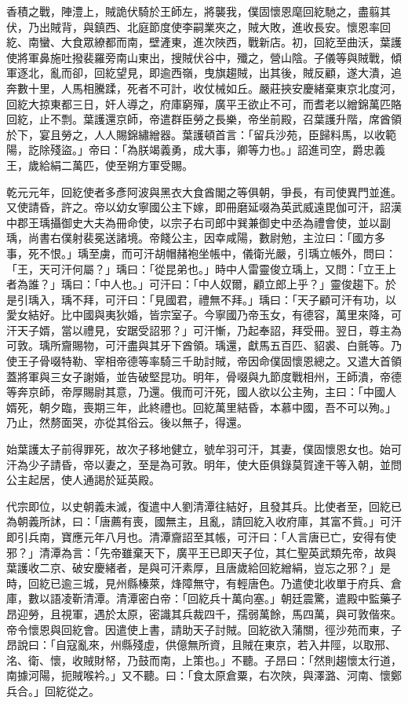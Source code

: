 \begin{pinyinscope}
 香積之戰，陣澧上，賊詭伏騎於王師左，將襲我，僕固懷恩麾回紇馳之，盡翦其伏，乃出賊背，與鎮西、北庭節度使李嗣業夾之，賊大敗，進收長安。懷恩率回紇、南蠻、大食眾繚都而南，壁滻東，進次陜西，戰新店。初，回紇至曲沃，葉護使將軍鼻施吐撥裴羅旁南山東出，搜賊伏谷中，殲之，營山陰。子儀等與賊戰，傾軍逐北，亂而卻，回紇望見，即逾西嶺，曳旗趨賊，出其後，賊反顧，遂大潰，追奔數十里，人馬相騰蹂，死者不可計，收仗械如丘。嚴莊挾安慶緒棄東京北度河，回紇大掠東都三日，奸人導之，府庫窮殫，廣平王欲止不可，而耆老以繒錦萬匹賂回紇，止不剽。葉護還京師，帝遣群臣勞之長樂，帝坐前殿，召葉護升階，席酋領於下，宴且勞之，人人賜錦繡繒器。葉護頓首言：「留兵沙苑，臣歸料馬，以收範陽，訖除殘盜。」帝曰：「為朕竭義勇，成大事，卿等力也。」詔進司空，爵忠義王，歲給絹二萬匹，使至朔方軍受賜。



 乾元元年，回紇使者多彥阿波與黑衣大食酋閣之等俱朝，爭長，有司使異門並進。又使請昏，許之。帝以幼女寧國公主下嫁，即冊磨延啜為英武威遠毘伽可汗，詔漢中郡王瑀攝御史大夫為冊命使，以宗子右司郎中巽兼御史中丞為禮會使，並以副瑀，尚書右僕射裴冕送諸境。帝餞公主，因幸咸陽，數尉勉，主泣曰：「國方多事，死不恨。」瑀至虜，而可汗胡帽赭袍坐帳中，儀衛光嚴，引瑀立帳外，問曰：「王，天可汗何屬？」瑀曰：「從昆弟也。」時中人雷靈俊立瑀上，又問：「立王上者為誰？」瑀曰：「中人也。」可汗曰：「中人奴爾，顧立郎上乎？」靈俊趨下。於是引瑀入，瑀不拜，可汗曰：「見國君，禮無不拜。」瑀曰：「天子顧可汗有功，以愛女結好。比中國與夷狄婚，皆宗室子。今寧國乃帝玉女，有德容，萬里來降，可汗天子婿，當以禮見，安踞受詔邪？」可汗慚，乃起奉詔，拜受冊。翌日，尊主為可敦。瑀所齎賜物，可汗盡與其牙下酋領。瑀還，獻馬五百匹、貂裘、白氈等。乃使王子骨啜特勒、宰相帝德等率騎三千助討賊，帝因命僕固懷恩總之。又遣大首領蓋將軍與三女子謝婚，並告破堅昆功。明年，骨啜與九節度戰相州，王師潰，帝德等奔京師，帝厚賜尉其意，乃還。俄而可汗死，國人欲以公主殉，主曰：「中國人婿死，朝夕臨，喪期三年，此終禮也。回紇萬里結昏，本慕中國，吾不可以殉。」乃止，然剺面哭，亦從其俗云。後以無子，得還。



 始葉護太子前得罪死，故次子移地健立，號牟羽可汗，其妻，僕固懷恩女也。始可汗為少子請昏，帝以妻之，至是為可敦。明年，使大臣俱錄莫賀達干等入朝，並問公主起居，使人通謁於延英殿。



 代宗即位，以史朝義未滅，復遣中人劉清潭往結好，且發其兵。比使者至，回紇已為朝義所訹，曰：「唐薦有喪，國無主，且亂，請回紇入收府庫，其富不貲。」可汗即引兵南，寶應元年八月也。清潭齎詔至其帳，可汗曰：「人言唐已亡，安得有使邪？」清潭為言：「先帝雖棄天下，廣平王已即天子位，其仁聖英武類先帝，故與葉護收二京、破安慶緒者，是與可汗素厚，且唐歲給回紇繒絹，豈忘之邪？」是時，回紇已逾三城，見州縣榛萊，烽障無守，有輕唐色。乃遣使北收單于府兵、倉庫，數以語凌靳清潭。清潭密白帝：「回紇兵十萬向塞。」朝廷震驚，遣殿中監藥子昂迎勞，且視軍，遇於太原，密識其兵裁四千，孺弱萬餘，馬四萬，與可敦偕來。帝令懷恩與回紇會。因遣使上書，請助天子討賊。回紇欲入蒲關，徑沙苑而東，子昂說曰：「自寇亂來，州縣殘虛，供億無所資，且賊在東京，若入井陘，以取邢、洺、衛、懷，收賊財帑，乃鼓而南，上策也。」不聽。子昂曰：「然則趨懷太行道，南據河陽，扼賊喉衿。」又不聽。曰：「食太原倉粟，右次陜，與澤潞、河南、懷鄭兵合。」回紇從之。




\end{pinyinscope}
